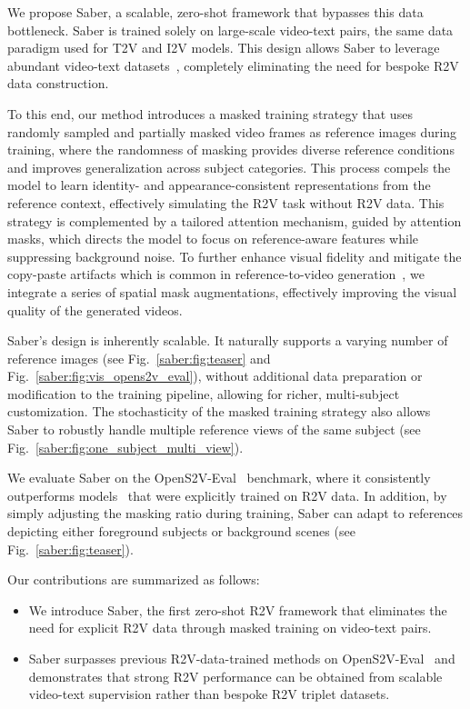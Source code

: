 We propose Saber, a scalable, zero-shot framework that bypasses this data bottleneck.
Saber is trained solely on large-scale video-text pairs, the same data paradigm used for T2V and I2V models.
This design allows Saber to leverage abundant video-text datasets~\citep{chen2024panda, wang2025koala, sstk}, completely eliminating the need for bespoke R2V data construction.

To this end, our method introduces a masked training strategy that uses randomly sampled and partially masked video frames as reference images during training, where the randomness of masking provides diverse reference conditions and improves generalization across subject categories.
This process compels the model to learn identity- and appearance-consistent representations from the reference context, effectively simulating the R2V task without R2V data.
This strategy is complemented by a tailored attention mechanism, guided by attention masks, which directs the model to focus on reference-aware features while suppressing background noise.
To further enhance visual fidelity and mitigate the copy-paste artifacts which is common in reference-to-video generation~\citep{liu2025phantom, fei2025skyreels, hu2025hunyuancustom}, we integrate a series of spatial mask augmentations, effectively improving the visual quality of the generated videos.

Saber's design is inherently scalable.
It naturally supports a varying number of reference images (see Fig.~\ref{saber:fig:teaser} and Fig.~\ref{saber:fig:vis_opens2v_eval}), without additional data preparation or modification to the training pipeline, allowing for richer, multi-subject customization.
The stochasticity of the masked training strategy also allows Saber to robustly handle multiple reference views of the same subject (see Fig.~\ref{saber:fig:one_subject_multi_view}).

We evaluate Saber on the OpenS2V-Eval~\citep{yuan2025opens2v} benchmark, where it consistently outperforms models~\citep{zhou2024sugar, liu2025phantom, jiang2025vace, deng2025magref, fei2025skyreels, hu2025polyvivid, li2025bindweave} that were explicitly trained on R2V data.
In addition, by simply adjusting the masking ratio during training, Saber can adapt to references depicting either foreground subjects or background scenes (see Fig.~\ref{saber:fig:teaser}).

Our contributions are summarized as follows:
\begin{itemize}
    \item We introduce Saber, the first zero-shot R2V framework that eliminates the need for explicit R2V data through masked training on video-text pairs.
    \item Saber surpasses previous R2V-data-trained methods on OpenS2V-Eval~\citep{yuan2025opens2v} and demonstrates that strong R2V performance can be obtained from scalable video-text supervision rather than bespoke R2V triplet datasets.
\end{itemize}

